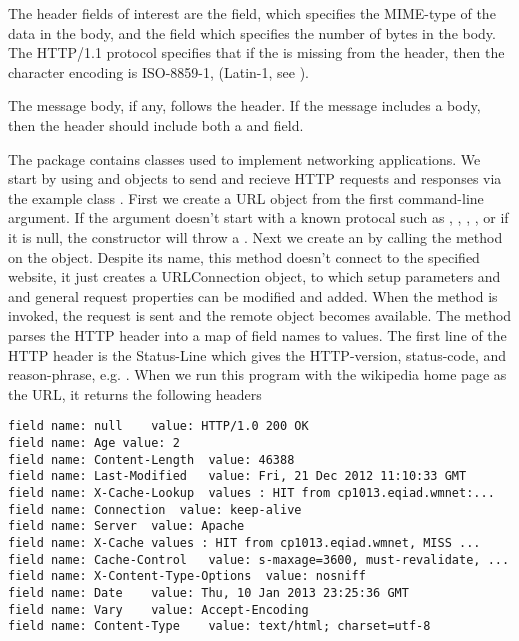 The header fields of interest are the  field, which specifies
the MIME-type of the data in the body, and the  field which
specifies the number of bytes in the body.
The HTTP/1.1 protocol specifies that if the  is missing from the header,
then the character encoding is ISO-8859-1, (Latin-1, see ).

The message body, if any, follows the header.  If the message includes a body, then
the header should include both a  and  field.

The  package contains classes used to implement networking applications.
We start by using  and  objects
to send and recieve HTTP requests and responses via the example class .
%
%
%
First we create a URL object from the first command-line argument.
If the argument doesn't start with a known protocal such as
, , , , or if it is null,
the constructor will throw a .
Next we create an  by calling the 
method on the  object.
Despite its name, this method doesn't connect to the specified website, it just
creates a URLConnection object, to which setup parameters and and general 
request properties can be modified and added.
When the  method is invoked, the request is sent and the remote object
becomes available.  
%
%
The method  parses the HTTP header into a map of
field names to values.
The first line of the HTTP header is the Status-Line which gives the
HTTP-version, status-code, and  reason-phrase, e.g.
.
When we run this program with the wikipedia home page as the URL,
it returns the following headers
%
\begin{verbatim}
field name: null	value: HTTP/1.0 200 OK 
field name: Age	value: 2
field name: Content-Length	value: 46388
field name: Last-Modified	value: Fri, 21 Dec 2012 11:10:33 GMT
field name: X-Cache-Lookup	values : HIT from cp1013.eqiad.wmnet:...
field name: Connection	value: keep-alive
field name: Server	value: Apache
field name: X-Cache	values : HIT from cp1013.eqiad.wmnet, MISS ...
field name: Cache-Control	value: s-maxage=3600, must-revalidate, ...
field name: X-Content-Type-Options	value: nosniff
field name: Date	value: Thu, 10 Jan 2013 23:25:36 GMT
field name: Vary	value: Accept-Encoding
field name: Content-Type	value: text/html; charset=utf-8
\end{verbatim}
